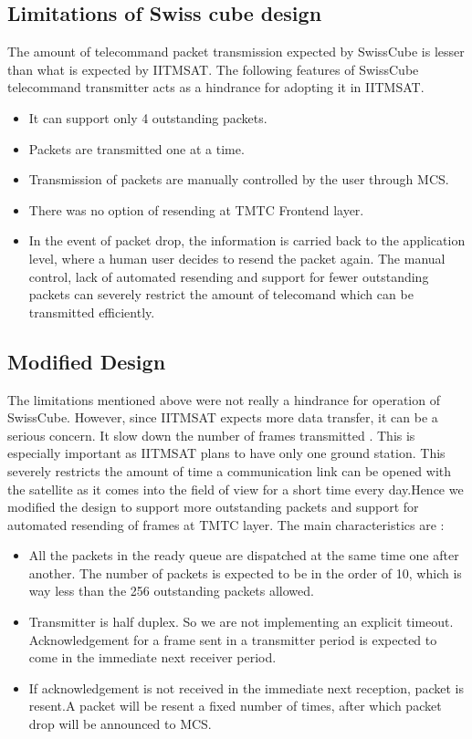 \documentclass[BTech]{iitmdiss}
\begin{document}
\subsection{Limitations of Swiss cube design}
The amount of telecommand packet transmission expected by SwissCube is lesser than what is expected by IITMSAT. The following features of SwissCube telecommand transmitter acts as a hindrance for adopting it in IITMSAT.
\begin{itemize}
\item It can support only 4 outstanding packets.
\item Packets are transmitted one at a time.
\item Transmission of packets are manually controlled by the user through MCS.
\item There was no option of resending at TMTC Frontend layer.
\item In the event of packet drop, the information is carried back to the application level, where a human user decides to resend the packet again.
The manual control, lack of automated resending and support for fewer outstanding packets can severely restrict the amount of telecomand which can be transmitted efficiently. 

\end{itemize}

\subsection{Modified Design}
The limitations mentioned above were not really a hindrance for operation of SwissCube. However, since IITMSAT expects more data transfer, it can be a serious concern. It slow down the number of frames transmitted . This is especially important as IITMSAT plans to have only one ground station. This severely restricts the amount of time a communication link can be opened with the satellite as it comes into the field of view for a short time every day.Hence we modified the design to support more outstanding packets and support for automated resending of frames at TMTC layer. The main characteristics are :
\begin{itemize}

\item All the packets in the ready queue are dispatched at the same time one after another. The number of packets is expected to be in the order of 10, which is way less than the 256 outstanding packets allowed.
\item Transmitter is half duplex. So we are not implementing an explicit timeout. Acknowledgement for a frame sent in a transmitter period is expected to come in the immediate next receiver period.
\item If acknowledgement is not received in the immediate next reception, packet is resent.A packet will be resent a fixed number of times, after which packet drop will be announced to MCS.

\end{itemize}
\end{document}
